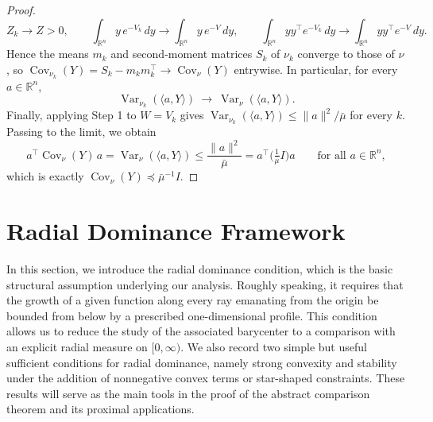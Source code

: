 \documentclass[11pt]{article}
\newcommand{\1}{\mathds{1}}
\theoremstyle{definition}
\theoremstyle{remark}
\theoremstyle{definition}
\begin{document}
\begin{proof}
\[
Z_k\to Z>0,\qquad
\int_{\mathbb{R}^n} y\,e^{-V_k}\,dy\to\int_{\mathbb{R}^n} y\,e^{-V}\,dy,\qquad
\int_{\mathbb{R}^n} yy^{\top}e^{-V_k}\,dy\to\int_{\mathbb{R}^n} yy^{\top}e^{-V}\,dy .
\]
Hence the means \(m_k\) and second-moment matrices \(S_k\) of \(\nu_k\) converge
to those of \(\nu\), so
\(\operatorname{Cov}_{\nu_k}(Y)=S_k-m_km_k^{\top}\to
\operatorname{Cov}_{\nu}(Y)\) entrywise. In particular, for every
\(a\in\mathbb R^n\),
\[
\operatorname{Var}_{\nu_k}(\langle a,Y\rangle)
\ \longrightarrow\
\operatorname{Var}_{\nu}(\langle a,Y\rangle).
\]
Finally, applying Step 1 to \(W=V_k\) gives
\(\operatorname{Var}_{\nu_k}(\langle a,Y\rangle)\le\|a\|^{2}/\bar\mu\) for every
\(k\). Passing to the limit, we obtain 
\[
a^{\top}\operatorname{Cov}_{\nu}(Y)\,a
=\operatorname{Var}_{\nu}(\langle a,Y\rangle)
\le\frac{\|a\|^{2}}{\bar\mu}
=a^{\top}\Big(\tfrac1{\bar\mu}I\Big)a
\qquad\text{for all }a\in\mathbb R^n ,
\]
which is exactly \(\operatorname{Cov}_{\nu}(Y)\preceq\bar\mu^{-1}I\).
\end{proof}



\section{Radial Dominance Framework}\label{radial-dominance-section}
In this section, we introduce the radial dominance condition, which is the basic structural assumption underlying our analysis. Roughly speaking, it requires that the growth of a given function along every ray emanating from the origin be bounded from below by a prescribed one-dimensional profile. This condition allows us to reduce the study of the associated barycenter to a comparison with an explicit radial measure on \([0,\infty)\). We also record two simple but useful sufficient conditions for radial dominance, namely strong convexity and stability under the addition of nonnegative convex terms or star-shaped constraints. These results will serve as the main tools in the proof of the abstract comparison theorem and its proximal applications.
\end{document}

